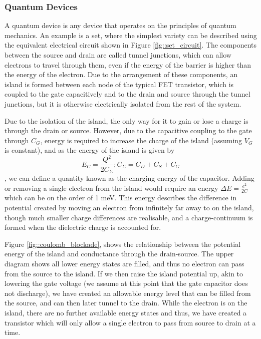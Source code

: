 \subsubsection{Quantum Devices}
\label{sec::set}
A quantum device is any device that operates on the principles of quantum mechanics. An example is a \gls{set}, where the simplest variety can be described using the equivalent electrical circuit \cite{devoret2000amplifying} shown in Figure \ref{fig::set_circuit}. The components between the source and drain are called tunnel junctions, which can allow electrons to travel through them, even if the energy of the barrier is higher than the energy of the electron. Due to the arrangement of these components, an island is formed between each node of the typical FET transistor, which is coupled to the gate capacitively and to the drain and source through the tunnel junctions, but it is otherwise electrically isolated from the rest of the system.

Due to the isolation of the island, the only way for it to gain or lose a charge is through the drain or source. However, due to the capacitive coupling to the gate through $C_G$, energy is required to increase the charge of the island (assuming $V_G$ is constant), and as the energy of the island is given by $$E_C = \frac{Q^2}{2 C_\Sigma} ; C_\Sigma = C_D + C_S + C_G$$, we can define a quantity known as the charging energy of the capacitor. Adding or removing a single electron from the island would require an energy $\Delta E = \frac{e^2}{2 C}$ which can be on the order of 1 meV. This energy describes the difference in potential created by moving an electron from infinitely far away to on the island, though much smaller charge differences are realisable, and a charge-continuum is formed when the dielectric charge is accounted for.

Figure \ref{fig::coulomb_blockade}, shows the relationship between the potential energy of the island and conductance through the drain-source. The upper diagram shows all lower energy states are filled, and thus no electron can pass from the source to the island. If we then raise the island potential up, akin to lowering the gate voltage (we assume at this point that the gate capacitor does not discharge), we have created an allowable energy level that can be filled from the source, and can then later tunnel to the drain. While the electron is on the island, there are no further available energy states and thus, we have created a transistor which will only allow a single electron to pass from source to drain at a time.

